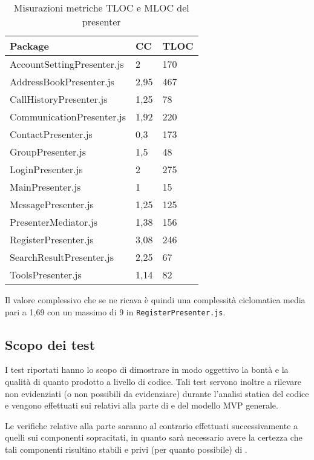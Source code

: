 \begin{table}[H]
\centering
{}
\begin{tabular}{p{}ll}
\toprule Package & CC  & TLOC\\
\midrule
AccountSettingPresenter.js & 2 & 170\\
AddressBookPresenter.js & 2,95 & 467\\
CallHistoryPresenter.js & 1,25 & 78\\
CommunicationPresenter.js & 1,92 & 220\\
ContactPresenter.js & 0,3 & 173\\
GroupPresenter.js & 1,5 & 48\\ 
LoginPresenter.js & 2 & 275\\
MainPresenter.js & 1 & 15\\
MessagePresenter.js & 1,25 & 125\\
PresenterMediator.js & 1,38 & 156\\
RegisterPresenter.js & 3,08 & 246\\
SearchResultPresenter.js & 2,25 & 67\\
ToolsPresenter.js & 1,14 & 82\\
\bottomrule
\end{tabular}
\caption{Misurazioni metriche TLOC e MLOC del presenter} \label{tab: metricheTLOCMLOCpresenter}
\end{table}
Il valore complessivo che se ne ricava è quindi una complessità ciclomatica media pari a 1,69 con un massimo di 9 in \texttt{RegisterPresenter.js}.


\subsection{Scopo dei test}
I test riportati hanno lo scopo di dimostrare in modo oggettivo la bontà e la qualità di quanto prodotto a livello di codice. Tali test servono inoltre a rilevare  non evidenziati (o non possibili da evidenziare) durante l'analisi statica del codice e vengono effettuati sui  relativi alla parte di  e  del modello MVP generale.

Le verifiche relative alla parte  saranno al contrario effettuati successivamente a quelli sui componenti sopracitati, in quanto sarà necessario avere la certezza che tali componenti risultino stabili e privi (per quanto possibile) di .

